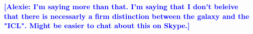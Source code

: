 \documentclass{emulateapj}
\def\mden{{$\mu_{\star}$}}
\newcommand{\addref}{{\textcolor{red}{REF}}}
\newcommand{\alexie}[1]{\textcolor{blue}{\textbf{[Alexie: #1]}}}
\begin{document}
\begin{CJK*}{UTF8}{gbsn}
    \alexie{I'm saying more than that. I'm saying that I don't beleive that there is necessarly a firm distinction between the galaxy and the "ICL". Might be easier to chat about this on Skype.}
 
 


\end{CJK*}
\end{document}
